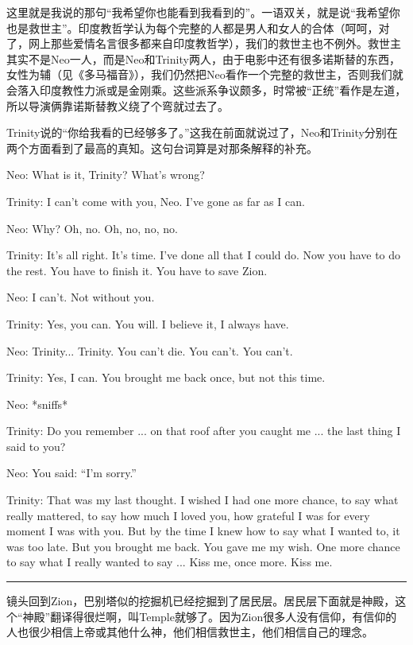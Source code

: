 \documentclass[UTF8]{ctexart}
\newcommand{\myparsep}{\noindent \rule[0.5ex]{\linewidth}{1pt}}
\newenvironment{myquote}{\color{green} \setlength{\leftskip}{6em} \setlength{\rightskip}{4em} \setlength{\parindent}{-2em}}{\par}
\begin{document}
这里就是我说的那句“我希望你也能看到我看到的”。一语双关，就是说“我希望你也是救世主”。印度教哲学认为每个完整的人都是男人和女人的合体（呵呵，对了，网上那些爱情名言很多都来自印度教哲学），我们的救世主也不例外。救世主其实不是Neo一人，而是Neo和Trinity两人，由于电影中还有很多诺斯替的东西，女性为辅（见《多马福音》），我们仍然把Neo看作一个完整的救世主，否则我们就会落入印度教性力派或是金刚乘。这些派系争议颇多，时常被“正统”看作是左道，所以导演俩靠诺斯替教义绕了个弯就过去了。

Trinity说的“你给我看的已经够多了。”这我在前面就说过了，Neo和Trinity分别在两个方面看到了最高的真知。这句台词算是对那条解释的补充。

\begin{myquote}
Neo: What is it, Trinity? What's wrong?

Trinity: I can't come with you, Neo. I've gone as far as I can.

Neo: Why? Oh, no. Oh, no, no, no.

Trinity: It's all right. It's time. I've done all that I could do. Now you have to do the rest. You have to finish it. You have to save Zion.

Neo: I can't. Not without you.

Trinity: Yes, you can. You will. I believe it, I always have.

Neo: Trinity... Trinity. You can't die. You can't. You can't.

Trinity: Yes, I can. You brought me back once, but not this time.

Neo: *sniffs*

Trinity: Do you remember ... on that roof after you caught me ... the last thing I said to you?

Neo: You said: ``I'm sorry.''

Trinity: That was my last thought. I wished I had one more chance, to say what really mattered, to say how much I loved you, how grateful I was for every moment I was with you. But by the time I knew how to say what I wanted to, it was too late. But you brought me back. You gave me my wish. One more chance to say what I really wanted to say ... Kiss me, once more. Kiss me.
\end{myquote}

\myparsep

镜头回到Zion，巴别塔似的挖掘机已经挖掘到了居民层。居民层下面就是神殿，这个“神殿”翻译得很烂啊，叫Temple就够了。因为Zion很多人没有信仰，有信仰的人也很少相信上帝或其他什么神，他们相信救世主，他们相信自己的理念。
\end{document}
